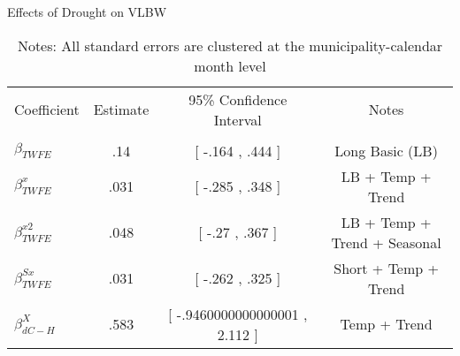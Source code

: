 \begin{table}[!ht]
\centering
\caption{Effects of Drought on VLBW}\label{tab:twfe_vlbw_test}
\renewcommand{\arraystretch}{1.5}
\fontsize{10pt}{12pt}\selectfont
\begin{tabular}{lccc}
\toprule
 \multicolumn{1}{c}{Coefficient}  &\multicolumn{1}{c}{Estimate}&\multicolumn{1}{c}{95\% Confidence Interval}&\multicolumn{1}{c}{Notes}\\\cmidrule(lr){2-2}\cmidrule(lr){3-3}\cmidrule(lr){4-4} \\
\midrule
 $ \beta_{TWFE} $ & .14  & [ -.164 ,  .444 ] & Long Basic (LB) \\
 $ \beta^{x}_{TWFE} $ & .031  &  [ -.285 ,  .348  ] & LB + Temp + Trend \\
 $ \beta^{x2}_{TWFE} $ & .048  & [ -.27 ,  .367  ] & LB + Temp + Trend + Seasonal \\
 $ \beta^{Sx}_{TWFE} $ & .031  & [ -.262 ,  .325  ] & Short + Temp + Trend \\
 $ \beta^{X}_{dC-H} $ & .583  & [ -.9460000000000001 ,  2.112 ] & Temp + Trend \\
\bottomrule
\end{tabular}
\caption*{\footnotesize{Notes: All standard errors are clustered at the municipality-calendar month level}}
\end{table}
